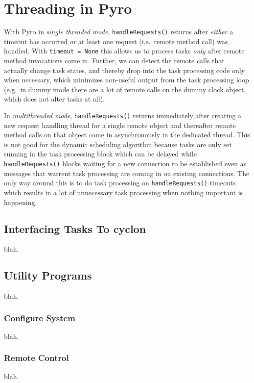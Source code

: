 \documentclass[11pt,a4paper]{article}
\begin{document}
\section{Threading in Pyro} \label{pyro-appendix}

With Pyro in {\em single threaded mode}, \verb#handleRequests()# returns
after {\em either} a timeout has occurred {\em or} at least one request
(i.e.\ remote method call) was handled. With \verb#timeout = None# this
allows us to process tasks {\em only} after remote method invocations
come in.  Further, we can detect the remote calls that actually change
task states, and thereby drop into the task processing code only when
necessary, which minimizes non-useful output from the task processing
loop (e.g.\ in dummy mode there are a lot of remote calls on the dummy
clock object, which does not alter tasks at all). 

In {\em multithreaded mode}, \verb#handleRequests()# returns immediately
after creating a new request handling thread for a single remote object
and thereafter remote method calls on that object come in asynchronously
in the dedicated thread. This is not good for the dynamic scheduling
algorithm because tasks are only set running in the task processing
block which can be delayed while \verb#handleRequests()# blocks waiting
for a new connection to be established even as messages that warrent
task processing are coming in on existing connections. The only way
around this is to do task processing on \verb#handleRequests()# timeouts
which results in a lot of unnecessary task processing when nothing
important is happening.


\subsection{Interfacing Tasks To cyclon}
blah.

\subsection{Utility Programs}
blah.

\subsubsection{Configure System}
blah.

\subsubsection{Remote Control}
blah.
\end{document}
